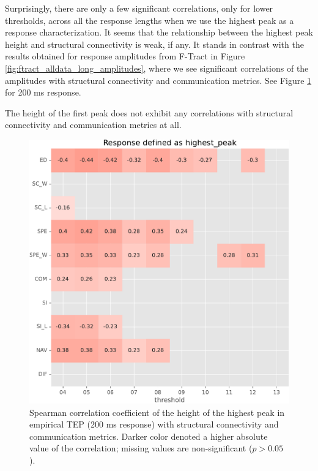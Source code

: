 Surprisingly, there are only a few significant correlations, only for lower thresholds, across all the response lengths when we use the highest peak as a response characterization. It seems that the relationship between the highest peak height and structural connectivity is weak, if any. It stands in contrast with the results obtained for response amplitudes from F-Tract in Figure \ref{fig:ftract_alldata_long_amplitudes}, where we see significant correlations of the amplitudes with structural connectivity and communication metrics. See Figure \ref{fig:tms_heighest_200} for 200 ms response.

The height of the first peak does not exhibit any correlations with structural connectivity and communication metrics at all. 

\begin{figure}
    \centering
    \includegraphics[width=\textwidth]{images/nootebook_generated/tmseeg_results/empirical/200/not_over_threshold_nan/Response defined as highest_peak.pdf}
    \caption[TEPs highest peak (200 ms) correlations]{Spearman correlation coefficient of the height of the highest peak in empirical TEP (200 ms response) with structural connectivity and communication metrics. Darker color denoted a higher absolute value of the correlation; missing values are non-significant ($p>0.05$).}
    \label{fig:tms_heighest_200}
\end{figure}

